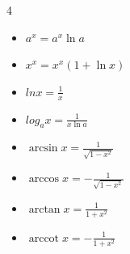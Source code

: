 \documentclass[10pt,a4paper]{article}
\begin{document}
\begin{multicols*}{4}
\begin{center}
\begin{small}
\begin{itemize}
			\item \begin{math}
				      a^x = a^x \ln a
			      \end{math}
			\item \begin{math}
				      x^x = x^x (1+\ln x)
			      \end{math}
			\item \begin{math}
				      ln x = \frac{1}{x}
			      \end{math}
			\item \begin{math}
				      log_a x = \frac{1}{x \ln a}
			      \end{math}
			\item \begin{math}
				      \arcsin x = \frac{1}{\sqrt {1 - x^2}}
			      \end{math}
			\item \begin{math}
				      \arccos x = - \frac{1}{\sqrt{1 - x^2}}
			      \end{math}
			\item \begin{math}
				      \arctan x = \frac{1}{1 + x^2}
			      \end{math}
			\item \begin{math}
				      \operatorname{arccot}x = -\frac{1}{1 + x^2}
			      \end{math}
		\end{itemize}
	\end{small}
\end{center}


\end{multicols*}
\end{document}
